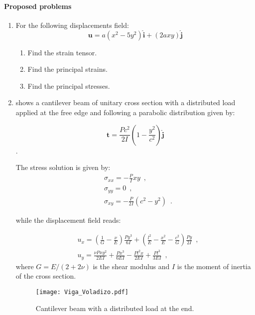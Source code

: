 \paragraph*{Proposed problems}

\begin{enumerate}

\item \label{punto01} For the following displacements field:
\[\mathbf{u} = a(x^2 - 5y^2)\hat{\mathbf{i}} + (2ax y)\hat{\mathbf{j}} \]

\begin{enumerate}
\item Find the strain tensor.
\item Find the principal strains.
\item Find the principal stresses.
\end{enumerate}


\item \label{punto02}  shows a cantilever beam of unitary cross section with a distributed load applied at the free edge and following a parabolic distribution given by:

\[\mathbf{t} = \frac{Pc^2}{2I}\left(1-\frac{y^2}{c^2}\right)\hat{\mathbf{j}}\].

The stress solution is given by:
\begin{align*}
&\sigma_{xx} = -\frac{P}{I}xy \enspace ,\\
&\sigma_{yy} = 0 \enspace ,\\
&\sigma_{xy} = -\frac{P}{2I}(c^2 - y^2) \enspace .
\end{align*}

while the displacement field reads:

\begin{align*}
&u_{x} = \left(\frac{1}{G} - \frac{\nu}{E}\right)\frac{Py^3}{6I} + \left(\frac{l^2}{E} - \frac{x^2}{E} - \frac{c^2}{G} \right)\frac{Py}{2I} \enspace ,\\
&u_{y} = \frac{\nu P xy^2}{2EI} + \frac{Px^3}{6EI} - \frac{Pl^2x}{2EI} + \frac{Pl^3}{3EI} \enspace ,
\end{align*}
where $G=E/(2 + 2\nu)$ is the shear modulus and $I$ is the moment of inertia of the cross section.

\begin{figure}[H]
	\centering
	\texttt{[image: Viga\_Voladizo.pdf]}
	\caption{Cantilever beam with a distributed load at the end.}
	\label{fig:vigaV}
\end{figure}



\end{enumerate}
